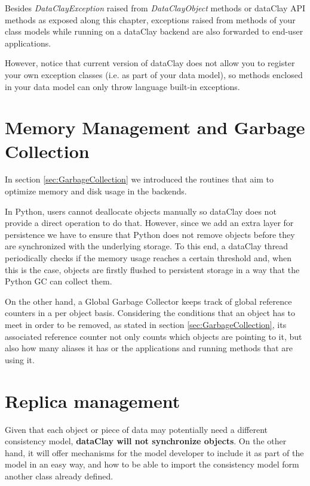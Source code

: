 Besides \textit{DataClayException} raised from \textit{DataClayObject} methods or dataClay API methods as exposed along this chapter, exceptions raised from methods of your class models while running on a dataClay backend are also forwarded to end-user applications.

However, notice that current version of dataClay does not allow you to register your own exception classes (i.e. as part of your data model), so methods enclosed in your data model can only throw language built-in exceptions.

\section {Memory Management and Garbage Collection}

In section \ref{sec:GarbageCollection} we introduced the routines that aim to optimize memory and disk usage in the backends.

In Python, users cannot deallocate objects manually so dataClay does not provide a direct operation to do that. However, since we add an extra layer for persistence we have to ensure that Python does not remove objects before they are synchronized with the underlying storage. To this end, a dataClay thread periodically checks if the memory usage reaches a certain threshold and, when this is the case, objects are firstly flushed to persistent storage in a way that the Python GC can collect them.

On the other hand, a Global Garbage Collector keeps track of global reference counters in a per object basis. Considering the conditions that an object has to meet in order to be removed, as stated in section \ref{sec:GarbageCollection}, its associated reference counter not only counts which objects are pointing to it, but also how many aliases it has or the applications and running methods that are using it.

\section{Replica management}
\label{sec:PythonReplication}

Given that each object or piece of data may potentially need a different consistency model, {\bf dataClay will not synchronize objects}. On the other hand, it will offer mechanisms for the model developer to include it as part of the model in an easy way, and how to be able to import the consistency model form another class already defined.

